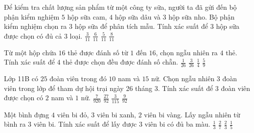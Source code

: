\begin{ex}%
    Để kiểm tra chất lượng sản phẩm từ một công ty sữa, người ta đã gửi đến bộ phận kiểm nghiệm $5$ hộp sữa cam, $4$ hộp sữa dâu và $3$ hộp sữa nho. Bộ phận kiểm nghiệm chọn ra $3$ hộp sữa để phân tích mẫu. Tính xác suất để $3$ hộp sữa được chọn có đủ cả $3$ loại.
    \choice
    {\True $\frac{3}{11}$}
    {$\frac{6}{11}$}
    {$\frac{5}{11}$}
    {$\frac{8}{11}$}
\end{ex}
\begin{ex}%
    Từ một hộp chứa $16$ thẻ được đánh số từ $1$ đến $16$, chọn ngẫu nhiên ra $4$ thẻ. Tính xác suất để $4$ thẻ được chọn đều được đánh số chẵn.
    \choice
    {\True $\frac{1}{26}$}
    {$\frac{3}{26}$}
    {$\frac{1}{4}$}
    {$\frac{5}{9}$}
\end{ex}
\begin{ex}%
    Lớp 11B có $25$ đoàn viên trong đó $10$ nam và $15$ nữ. Chọn ngẫu nhiên $3$ đoàn viên trong lớp để tham dự hội trại ngày 26 tháng 3. Tính xác suất để $3$ đoàn viên được chọn có $2$ nam và $1$ nữ.
    \choice
    {$\frac{7}{920}$}
    {\True $\frac{27}{92}$}
    {$\frac{3}{115}$}
    {$\frac{9}{92}$}
\end{ex}
\begin{ex}%
    Một bình đựng $4$ viên bi đỏ, $3$ viên bi xanh, $2$ viên bi vàng. Lấy ngẫu nhiên từ bình ra $3$ viên bi. Tính xác suất để lấy được $3$ viên bi có đủ ba màu.
    \choice
    {$\frac{1}{3}$}
    {\True $\frac{2}{7}$}
    {$\frac{2}{3}$}
    {$\frac{1}{5}$}
\end{ex}
